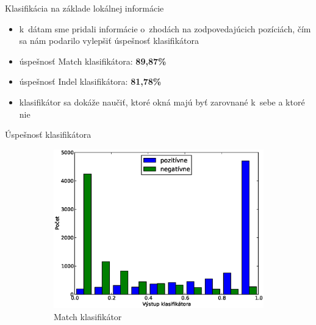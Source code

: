 \documentclass[xcolor=dvipsnames, compress, 12pt]{beamer}
\theoremstyle{definition}
\begin{document}
\begin{frame}{Klasifikácia na základe lokálnej informácie}
  \begin{itemize}
    \item k~dátam sme pridali informácie o~zhodách na zodpovedajúcich pozíciách, čím sa nám podarilo vylepšiť úspešnosť klasifikátora
    \item úspešnosť Match klasifikátora: \textbf{89,87\%}
    \item úspešnosť Indel klasifikátora: \textbf{81,78\%}
    \item klasifikátor sa dokáže naučiť, ktoré okná majú byť zarovnané k~sebe a ktoré nie
\end{itemize}
\end{frame}


\begin{frame}{Úspešnosť klasifikátora}
\begin{figure}[h]
        \centering
        \begin{subfigure}[b]{0.35\textwidth}
               \includegraphics[width=\textwidth]{images/randomforest_combined_5_test}
                \caption{Match klasifikátor}
        \end{subfigure}%
        \qquad\qquad %
        \begin{subfigure}[b]{0.35\textwidth}

\end{subfigure}
\end{figure}
\end{frame}
\end{document}
